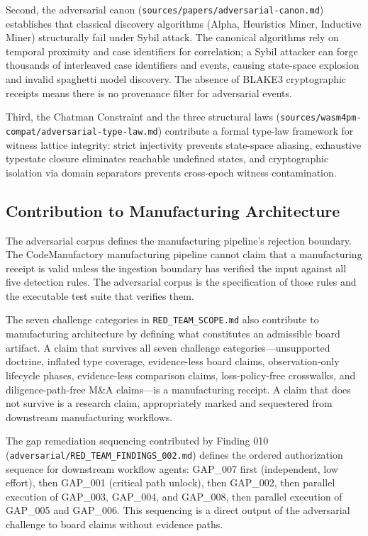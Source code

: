 Second, the adversarial canon (\texttt{sources/papers/adversarial-canon.md}) establishes
that classical discovery algorithms (Alpha, Heuristics Miner, Inductive Miner) structurally
fail under Sybil attack. The canonical algorithms rely on temporal proximity and case
identifiers for correlation; a Sybil attacker can forge thousands of interleaved case
identifiers and events, causing state-space explosion and invalid spaghetti model discovery.
The absence of BLAKE3 cryptographic receipts means there is no provenance filter for
adversarial events.

Third, the Chatman Constraint and the three structural laws
(\texttt{sources/wasm4pm-compat/adversarial-type-law.md}) contribute a formal type-law
framework for witness lattice integrity: strict injectivity prevents state-space aliasing,
exhaustive typestate closure eliminates reachable undefined states, and cryptographic isolation
via domain separators prevents cross-epoch witness contamination.

\subsection{Contribution to Manufacturing Architecture}
\label{sec:adversarial-contribution-manufacturing}

The adversarial corpus defines the manufacturing pipeline's rejection boundary. The
CodeManufactory manufacturing pipeline cannot claim that a manufacturing receipt is valid
unless the ingestion boundary has verified the input against all five detection rules. The
adversarial corpus is the specification of those rules and the executable test suite that
verifies them.

The seven challenge categories in \texttt{RED\_TEAM\_SCOPE.md} also contribute to
manufacturing architecture by defining what constitutes an admissible board artifact. A claim
that survives all seven challenge categories---unsupported doctrine, inflated type coverage,
evidence-less board claims, observation-only lifecycle phases, evidence-less comparison
claims, loss-policy-free crosswalks, and diligence-path-free M\&A claims---is a manufacturing
receipt. A claim that does not survive is a research claim, appropriately marked and
sequestered from downstream manufacturing workflows.

The gap remediation sequencing contributed by Finding 010
(\texttt{adversarial/RED\_TEAM\_FINDINGS\_002.md}) defines the ordered authorization sequence
for downstream workflow agents: GAP\_007 first (independent, low effort), then GAP\_001
(critical path unlock), then GAP\_002, then parallel execution of GAP\_003, GAP\_004, and
GAP\_008, then parallel execution of GAP\_005 and GAP\_006. This sequencing is a direct
output of the adversarial challenge to board claims without evidence paths.

